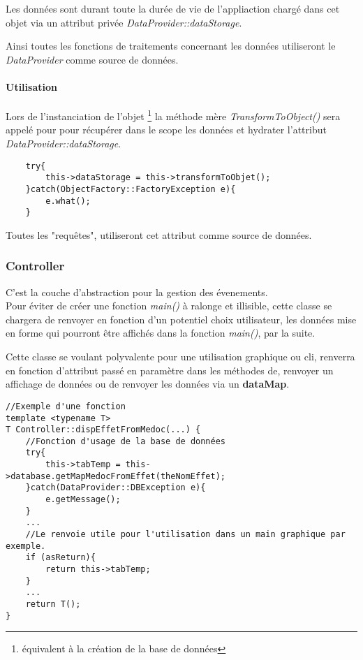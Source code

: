 \documentclass[12pt,a4paper]{report}
\begin{document}
Les données sont durant toute la durée de vie de l'appliaction chargé dans cet objet via un attribut privée \textit{DataProvider::dataStorage}.

Ainsi toutes les fonctions de traitements concernant les données utiliseront le \textit{DataProvider} comme source de données.

\paragraph*{Utilisation}

Lors de l'instanciation de l'objet \footnote{équivalent à la création de la base de données} la méthode mère \textit{TransformToObject()} sera appelé pour pour récupérer dans le scope les données et hydrater l'attribut \textit{DataProvider::dataStorage}. \\

\begin{verbatim}
	try{
		this->dataStorage = this->transformToObjet();
	}catch(ObjectFactory::FactoryException e){
		e.what();
	}
\end{verbatim}
Toutes les "requêtes", utiliseront cet attribut comme source de données. 

\subsubsection*{Controller}
C'est la couche d'abstraction pour la gestion des évenements. \\
Pour éviter de créer une fonction \textit{main()} à ralonge et illisible, cette classe se chargera de renvoyer en fonction d'un potentiel choix utilisateur, les données mise en forme qui pourront être affichés dans la fonction \textit{main()}, par la suite. 


Cette classe se voulant polyvalente pour une utilisation graphique ou cli, renverra en fonction d'attribut passé en paramètre dans les méthodes de, renvoyer un affichage de données ou de renvoyer les données via un \textbf{dataMap}. 

\begin{verbatim}
//Exemple d'une fonction
template <typename T>
T Controller::dispEffetFromMedoc(...) {
	//Fonction d'usage de la base de données
	try{
		this->tabTemp = this->database.getMapMedocFromEffet(theNomEffet);
	}catch(DataProvider::DBException e){
		e.getMessage();
	}
	...
	//Le renvoie utile pour l'utilisation dans un main graphique par exemple.
	if (asReturn){
		return this->tabTemp;
	}
	...
	return T();
}
\end{verbatim}
\end{document}
